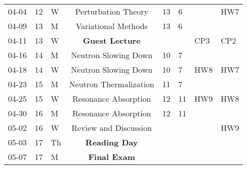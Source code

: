 \documentclass[11pt, a4paper]{article}
\begin{document}
\begin{table}[h]
\begin{center}
\begin{tabular}{lllcllll}
04-04 & 12 & W & Perturbation Theory & 13 & 6 &  & HW7\\
04-09 & 13 & M & Variational Methods & 13 & 6 & & \\
04-11 & 13 & W & \textbf{Guest Lecture} &  &  & CP3 & CP2\\
04-16 & 14 & M & Neutron Slowing Down & 10 &7 &  & \\
04-18 & 14 & W & Neutron Slowing Down & 10 & 7 & HW8 & HW7\\
04-23 & 15 & M & Neutron Thermalization & 11 & 7 &  & \\
04-25 & 15 & W & Resonance Absorption & 12 & 11 & HW9 & HW8 \\
04-30 & 16 & M & Resonance Absorption &  12 & 11 &  & \\
05-02 & 16 & W & Review and Discussion & &  &  & HW9\\
05-03 & 17 & Th & \textbf{Reading Day} &  &  &  & \\
05-07 & 17 & M & \textbf{Final Exam} &  &  &  & \\
\end{tabular}
\end{center}
\end{table}
\end{document}
